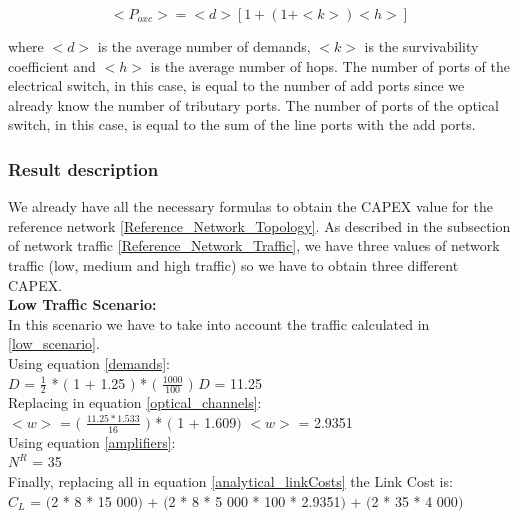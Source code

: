 \begin{equation}
<P_{oxc}> = <d> [1 + \left(1 + <k>\right) <h>]
\label{Poxc_transp_protec}
\end{equation}

\vspace{11pt}
\noindent
where $<d>$ is the average number of demands, $<k>$	is the survivability coefficient and $<h>$ is the average number of hops. The number of ports of the electrical switch, in this case, is equal to the number of add ports since we already know the number of tributary ports. The number of ports of the optical switch, in this case, is equal to the sum of the line ports with the add ports.\\


\subsubsection{Result description}

We already have all the necessary formulas to obtain the CAPEX value for the reference network \ref{Reference_Network_Topology}. As described in the subsection of network traffic \ref{Reference_Network_Traffic}, we have three values of network traffic (low, medium and high traffic) so we have to obtain three different CAPEX.\\
\newpage
\textbf{Low Traffic Scenario:}\\
In this scenario we have to take into account the traffic calculated in \ref{low_scenario}.\\

Using equation \ref{demands}:\\

$D$ = $\frac{1}{2}$ * $($ 1 + 1.25 $)$ * $($ $\frac{1000}{100}$ $)$ \qquad \qquad $D$ = 11.25\\

Replacing in equation \ref{optical_channels}:\\

$<w>$ = $($ $\frac{11.25 * 1.533}{16}$ $)$ * $($ 1 + 1.609$)$ \qquad \qquad $<w>$ = 2.9351\\

Using equation \ref{amplifiers}:\\

$N^R$ = 35\\

Finally, replacing all in equation \ref{analytical_linkCosts} the Link Cost is:\\

$C_L$ = $($2 * 8 * 15 000$)$ + $($2 * 8 * 5 000 * 100 * 2.9351$)$ + $($2 * 35 * 4 000$)$\\


